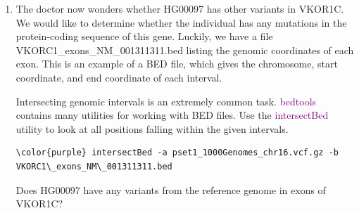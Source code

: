 \documentclass[12pt]{article}
\begin{document}
\begin{enumerate}
Now, use the tabix utility to pull out our SNP of interest:
\begin{Verbatim}[commandchars=\\\{\}]
\color{purple} tabix --print-header pset1\_1000Genomes\_chr16.vcf.gz 16:31104509-31104510
\end{Verbatim}

What dose should the doctor give to HG00097? What about HG00099 and HG00103?

\item The doctor now wonders whether HG00097 has other variants in VKOR1C. We would like to determine whether the individual has any mutations in the protein-coding sequence of this gene. Luckily, we have a file VKORC1\_exons\_NM\_001311311.bed listing the genomic coordinates of each exon. This is an example of a BED file, which gives the chromosome, start coordinate, and end coordinate of each interval.

Intersecting genomic intervals is an extremely common task. \textcolor{purple}{bedtools} contains many utilities for working with BED files. Use the \textcolor{purple}{intersectBed} utility to look at all positions falling within the given intervals.
\begin{Verbatim}[commandchars=\\\{\}]
\color{purple} intersectBed -a pset1_1000Genomes_chr16.vcf.gz -b VKORC1\_exons_NM\_001311311.bed
\end{Verbatim}

Does HG00097 have any variants from the reference genome in exons of VKOR1C?

\end{enumerate}
\end{document}
